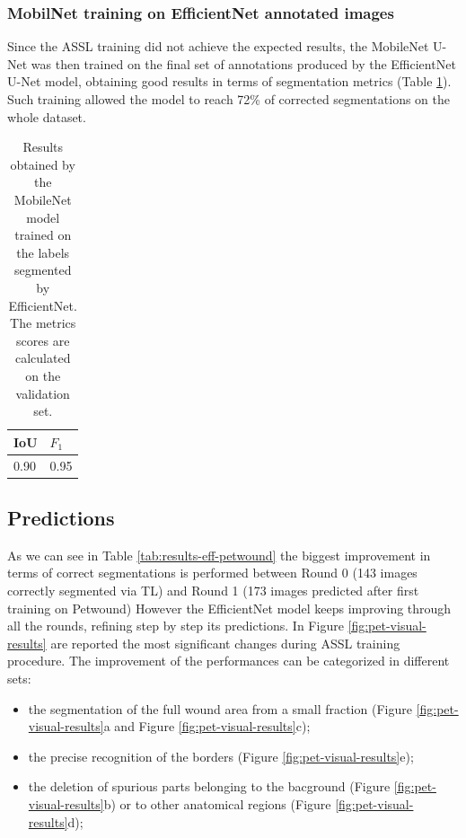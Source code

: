 \documentclass[../main.tex]{subfiles}
\begin{document}
\subsubsection{MobilNet training on EfficientNet annotated images}
Since the ASSL training did not achieve the expected results, the MobileNet U-Net was then trained on the final set of annotations produced by the EfficientNet U-Net model, obtaining good results in terms of segmentation metrics (Table \ref{tab:results-mob-score-petwound-noassl}).
Such training allowed the model to reach 72\% of corrected segmentations on the whole dataset.
\begin{table}[H]
    \centering
    
    \begin{tabular}{|l|l|}
    \hline
          IoU  & $F_1$  \\ \hline
        0.90 & 0.95 \\ \hline
    \end{tabular}
    \caption{Results obtained by the MobileNet model trained on the labels segmented by EfficientNet. The metrics scores are calculated on the validation set.}\label{tab:results-mob-score-petwound-noassl}
\end{table}
\subsection{Predictions}

As we can see in Table \ref{tab:results-eff-petwound} the biggest improvement in terms of correct segmentations is performed between Round 0 (143 images correctly segmented via TL) and Round 1 (173 images predicted after first training on Petwound)
However the EfficientNet model keeps improving through all the rounds, refining step by step its predictions.
In Figure \ref{fig:pet-visual-results} are reported the most significant changes during ASSL training procedure. 
The improvement of the performances can be categorized in different sets:
\begin{itemize}
    \item the segmentation of the full wound area from a small fraction (Figure \ref{fig:pet-visual-results}a and Figure \ref{fig:pet-visual-results}c);
    \item the precise recognition of the borders (Figure \ref{fig:pet-visual-results}e);
    \item the deletion of spurious parts belonging to the bacground (Figure \ref{fig:pet-visual-results}b) or to other anatomical regions (Figure \ref{fig:pet-visual-results}d);
\end{itemize}
\end{document}

